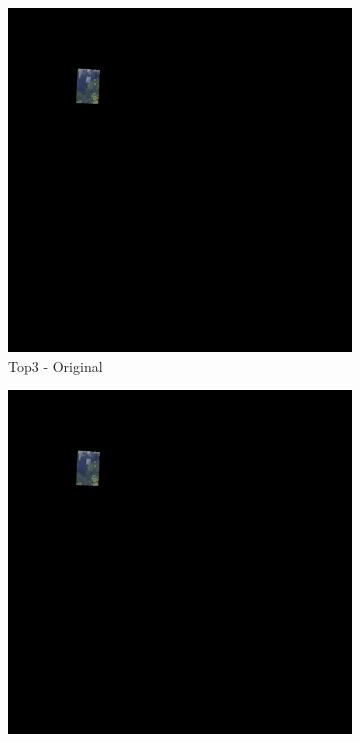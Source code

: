 \begin{figure}[H]
\begin{subfigure}{0.32\textwidth}
    \includegraphics[width=\textwidth]{02-main//figures/ch4/kfold_ensembles/linknet_timm-efficientnet-b5/worst_cases/worst_3_iou0.000_25011115_tile_17_4_52cb42_original.png}
    \caption{Top3 - Original}
\end{subfigure}
\hfill
\begin{subfigure}{0.32\textwidth}
    \includegraphics[width=\textwidth]{02-main//figures/ch4/kfold_ensembles/linknet_timm-efficientnet-b5/worst_cases/worst_3_iou0.000_25011115_tile_17_4_52cb42_overlay_gt.png}

\end{subfigure}
\end{figure}
